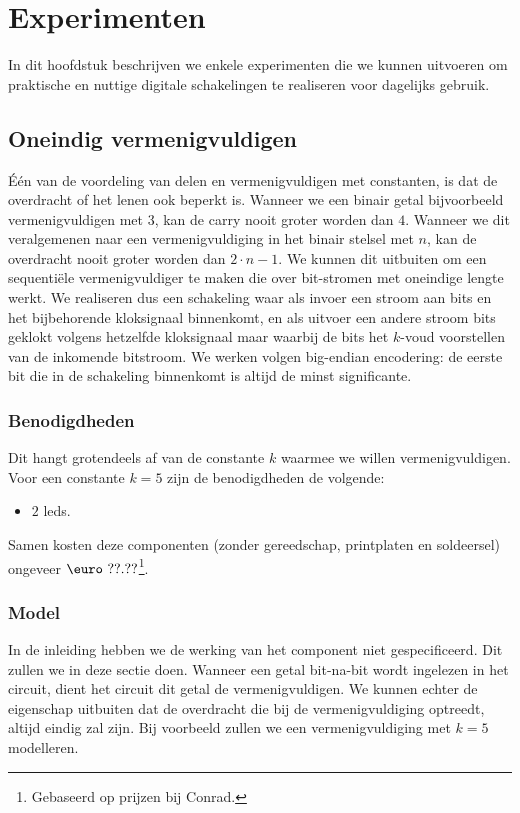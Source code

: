 \chapter{Experimenten}
\begin{chapterintro}
In dit hoofdstuk beschrijven we enkele experimenten die we kunnen uitvoeren om praktische en nuttige digitale schakelingen te realiseren voor dagelijks gebruik.
\end{chapterintro}
\minitoc[n]
\section{Oneindig vermenigvuldigen}
\'E\'en van de voordeling van delen en vermenigvuldigen met constanten, is dat de overdracht of het lenen ook beperkt is. Wanneer we een binair getal bijvoorbeeld vermenigvuldigen met $3$, kan de carry nooit groter worden dan $4$. Wanneer we dit veralgemenen naar een vermenigvuldiging in het binair stelsel met $n$, kan de overdracht nooit groter worden dan $2\cdot n-1$. We kunnen dit uitbuiten om een sequenti\"ele vermenigvuldiger te maken die over bit-stromen met oneindige lengte werkt. We realiseren dus een schakeling waar als invoer een stroom aan bits en het bijbehorende kloksignaal binnenkomt, en als uitvoer een andere stroom bits geklokt volgens hetzelfde kloksignaal maar waarbij de bits het $k$-voud voorstellen van de inkomende bitstroom. We werken volgen big-endian encodering: de eerste bit die in de schakeling binnenkomt is altijd de minst significante.
\subsection{Benodigdheden}
Dit hangt grotendeels af van de constante $k$ waarmee we willen vermenigvuldigen. Voor een constante $k=5$ zijn de benodigdheden de volgende:
\begin{itemize}
 \item $2$ leds.
\end{itemize}
Samen kosten deze componenten (zonder gereedschap, printplaten en soldeersel) ongeveer $\mbox{\euro}\ ??.??$\footnote{Gebaseerd op prijzen bij Conrad.}.
\subsection{Model}
In de inleiding hebben we de werking van het component niet gespecificeerd. Dit zullen we in deze sectie doen. Wanneer een getal bit-na-bit wordt ingelezen in het circuit, dient het circuit dit getal de vermenigvuldigen. We kunnen echter de eigenschap uitbuiten dat de overdracht die bij de vermenigvuldiging optreedt, altijd eindig zal zijn. Bij voorbeeld zullen we een vermenigvuldiging met $k=5$ modelleren.

